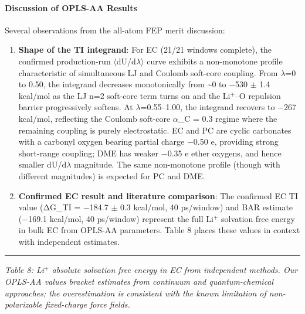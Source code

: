 \documentclass[
  11pt,
]{article}
\begin{document}
\paragraph{Discussion of OPLS-AA
Results}\label{discussion-of-opls-aa-results}

Several observations from the all-atom FEP merit discussion:

\begin{enumerate}
\def\labelenumi{\arabic{enumi}.}
\item
  \textbf{Shape of the TI integrand}: For EC (21/21 windows complete),
  the confirmed production-run \(\langle\)dU/d\(\lambda\)\(\rangle\)
  curve exhibits a non-monotone profile characteristic of simultaneous
  LJ and Coulomb soft-core coupling. From \(\lambda\)=0 to 0.50, the
  integrand decreases monotonically from \textasciitilde0 to −530
  \(\pm\) 1.4 kcal/mol as the LJ n=2 soft-core term turns on and the
  Li\(^{+}\)--O repulsion barrier progressively softens. At
  \(\lambda\)=0.55--1.00, the integrand recovers to −267 kcal/mol,
  reflecting the Coulomb soft-core \(\alpha\)\_C = 0.3 regime where the
  remaining coupling is purely electrostatic. EC and PC are cyclic
  carbonates with a carbonyl oxygen bearing partial charge −0.50 e,
  providing strong short-range coupling; DME has weaker −0.35 e ether
  oxygens, and hence smaller dU/d\(\lambda\) magnitude. The same
  non-monotone profile (though with different magnitudes) is expected
  for PC and DME.
\item
  \textbf{Confirmed EC result and literature comparison}: The confirmed
  EC TI value (ΔG\_TI = −184.7 \(\pm\) 0.3 kcal/mol, 40 ps/window) and
  BAR estimate (−169.1 kcal/mol, 40 ps/window) represent the full
  Li\(^{+}\) solvation free energy in bulk EC from OPLS-AA parameters.
  Table 8 places these values in context with independent estimates.
\end{enumerate}

\begin{center}\rule{0.5\linewidth}{0.5pt}\end{center}

\emph{Table 8: Li\(^{+}\) absolute solvation free energy in EC from
independent methods. Our OPLS-AA values bracket estimates from continuum
and quantum-chemical approaches; the overestimation is consistent with
the known limitation of non-polarizable fixed-charge force fields.}
\end{document}
